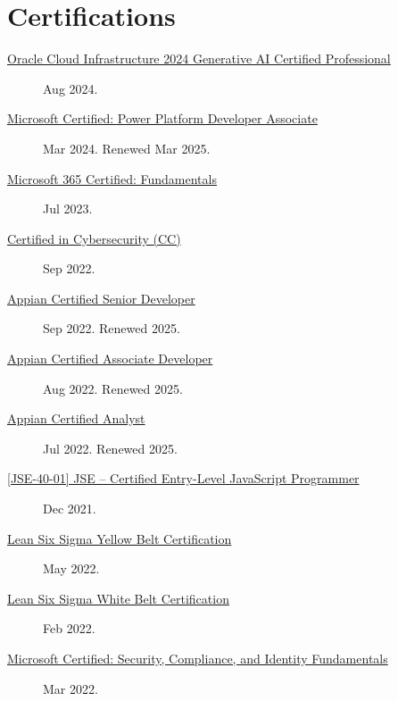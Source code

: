 \documentclass{article}
\begin{document}
\section*{Certifications}\vspace{-0.5em}
\begin{description}
  \item [\href{https://sirkoik.github.io/CurriculumVitae/certifications/Oracle-Cloud-Infrastructure-2024-Generative-AI-Certified-Professional/Oracle-Cloud-Infrastructure-2024-Generative-AI-Certified-Professional-eCertificate.pdf}{Oracle Cloud Infrastructure 2024 Generative AI Certified Professional}] Aug 2024.
  \item [\href{https://learn.microsoft.com/api/credentials/share/en-us/AlexKoikCestone-7541/99C5F49578EE2C21?sharingId=DCF7D068E6ED12E6}{Microsoft Certified: Power Platform Developer Associate}] Mar 2024. Renewed Mar 2025.
  \item [\href{https://learn.microsoft.com/api/credentials/share/en-us/AlexKoikCestone-7541/34191BBB3EBF09A3?sharingId=DCF7D068E6ED12E6}{Microsoft 365 Certified: Fundamentals}] Jul 2023.
  \item [\href{https://www.credly.com/badges/f0aab7ce-2f5d-4569-8705-3dc23fc34200/public_url}{Certified in Cybersecurity (CC)}] Sep 2022.
  \item [\href{https://community.appian.com/members/alexanderk5370?badge=cert&now=638483685447952604}{Appian Certified Senior Developer}] Sep 2022. Renewed 2025.
  \item [\href{https://community.appian.com/members/alexanderk5370?badge=cert&now=638483685447952604}{Appian Certified Associate Developer}] Aug 2022. Renewed 2025.
  \item [\href{https://community.appian.com/members/alexanderk5370?badge=cert&now=638483685447952604}{Appian Certified Analyst}] Jul 2022. Renewed 2025.
  \item [\href{https://www.credly.com/badges/e75210e4-8d08-43ea-af72-ec70ef666eee/public_url}{[JSE-40-01] JSE – Certified Entry-Level JavaScript Programmer}] Dec 2021.
  \item [\href{https://api.badgr.io/public/assertions/KE5P9gfoQ7S3-hpvZP4PIQ}{Lean Six Sigma Yellow Belt Certification}] May 2022.
  \item [\href{https://api.badgr.io/public/assertions/JhPP0s2rQWWGrc9ZkYqhkg}{Lean Six Sigma White Belt Certification}] Feb 2022.
  \item [\href{https://learn.microsoft.com/api/credentials/share/en-us/AlexKoikCestone-7541/DF45C662407C41C5?sharingId=DCF7D068E6ED12E6}{Microsoft Certified: Security, Compliance, and Identity Fundamentals}] Mar 2022.

\end{description}
\end{document}
